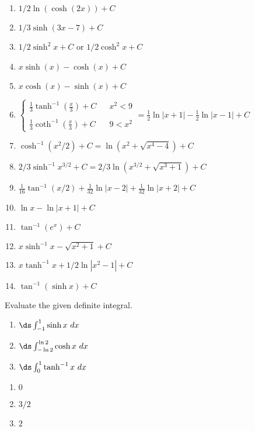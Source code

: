 \begin{enumialphparenastyle}
\begin{ex}
\begin{enumerate}
\end{enumerate}
	\begin{sol}
	\begin{enumerate}
	\item {$1/2\ln (\cosh(2x))+C$}
	\item {$1/3\sinh(3x-7)+C$}
	\item {$1/2\sinh^2x+C$ or $1/2\cosh^2x+C$}
	\item {$x \sinh (x)-\cosh (x)+C$
	}
	\item {$x \cosh (x)-\sinh (x)+C$
	}
	\item {$\left\{\begin{array}{ccc} \frac13\tanh^{-1}\left(\frac x3\right)+C & & x^2<9 \\ \\
	\frac13\coth^{-1}\left(\frac x3\right)+C & & 9<x^2 \end{array}\right. = \frac12\ln |x+1| - \frac12\ln |x-1|+C$} 
	\item  {$\cosh^{-1} (x^2/2) + C = \ln (x^2+\sqrt{x^4-4})+C$}
	\item {$2/3\sinh^{-1} x^{3/2} + C = 2/3\ln (x^{3/2}+\sqrt{x^3+1})+C$}
	\item {$\frac{1}{16}\tan^{-1}(x/2)+\frac{1}{32}\ln |x-2|+\frac1{32}\ln|x+2|+C$}
	\item {$\ln x- \ln|x+1|+C$}
	\item {$\tan^{-1}(e^x)+C$}
	\item {$x\sinh^{-1}x-\sqrt{x^2+1}+C$}
	\item {$x\tanh^{-1}x+1/2\ln|x^2-1|+C$}
	\item  {$\tan^{-1}(\sinh x)+C$} 
	\end{enumerate}
	\end{sol}
\end{ex}


\begin{ex}
Evaluate the given definite integral.
\begin{enumerate}
\item {$\ds \int_{-1}^1 \sinh x \ dx$}

\item {$\ds \int_{-\ln 2}^{\ln 2} \cosh x \ dx$}
\item {$\ds \int_{0}^{1} \tanh^{-1} x \ dx$}
\end{enumerate}
	\begin{sol}
	\begin{enumerate}
	\item {$0$}
	\item {$3/2$}
	
	\item {$2$}  
	\end{enumerate}
	\end{sol}
\end{ex}





\end{enumialphparenastyle}
